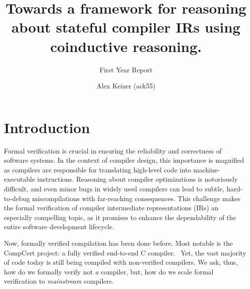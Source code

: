 \documentclass[a4paper]{scrartcl}
\begin{document}
\title{Towards a framework for reasoning about stateful compiler IRs 
using coinductive reasoning.}                                      
\subtitle{First Year Report}

\author{Alex Keizer \small{(ack55)}}
\date{}



\maketitle


\section{Introduction}

Formal verification is crucial in ensuring the reliability and
correctness of software systems. In the context of compiler design, this
importance is magnified as compilers are responsible for translating
high-level code into machine-executable instructions. Reasoning about
compiler optimizations is notoriously difficult, and even minor bugs in
widely used compilers can lead to subtle, hard-to-debug miscompilations
with far-reaching consequences. This challenge makes the formal
verification of compiler intermediate representations (IRs) an
especially compelling topic, as it promises to enhance the dependability
of the entire software development lifecycle.

Now, formally verified compilation has been done before.
Most notable is the CompCert project: a fully verified end-to-end C compiler.~\cite{leroyCompCertFormallyVerified} Yet, the vast majority of
code today is still being compiled with non-verified compilers. We ask,
thus, how do we formally verify not \emph{a} compiler, but, how do we
scale formal verification to \emph{mainstream} compilers.
\end{document}
